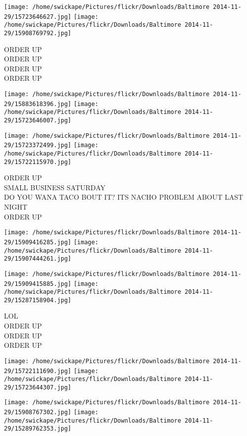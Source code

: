 \documentclass[10pt,letterpaper]{article}
\begin{document}
\texttt{[image: /home/swickape/Pictures/flickr/Downloads/Baltimore 2014-11-29/15723646627.jpg]}
\texttt{[image: /home/swickape/Pictures/flickr/Downloads/Baltimore 2014-11-29/15908769792.jpg]}

ORDER UP\\
ORDER UP\\
ORDER UP\\
ORDER UP\\
\pagebreak

\texttt{[image: /home/swickape/Pictures/flickr/Downloads/Baltimore 2014-11-29/15883618396.jpg]}
\texttt{[image: /home/swickape/Pictures/flickr/Downloads/Baltimore 2014-11-29/15723646007.jpg]}

\texttt{[image: /home/swickape/Pictures/flickr/Downloads/Baltimore 2014-11-29/15723372499.jpg]}
\texttt{[image: /home/swickape/Pictures/flickr/Downloads/Baltimore 2014-11-29/15722115970.jpg]}

ORDER UP\\
SMALL BUSINESS SATURDAY\\
DO YOU WANA TACO BOUT IT?  ITS NACHO PROBLEM ABOUT LAST NIGHT\\
ORDER UP\\
\pagebreak

\texttt{[image: /home/swickape/Pictures/flickr/Downloads/Baltimore 2014-11-29/15909416285.jpg]}
\texttt{[image: /home/swickape/Pictures/flickr/Downloads/Baltimore 2014-11-29/15907444261.jpg]}

\texttt{[image: /home/swickape/Pictures/flickr/Downloads/Baltimore 2014-11-29/15909415885.jpg]}
\texttt{[image: /home/swickape/Pictures/flickr/Downloads/Baltimore 2014-11-29/15287158904.jpg]}

LOL\\
ORDER UP\\
ORDER UP\\
ORDER UP\\
\pagebreak

\texttt{[image: /home/swickape/Pictures/flickr/Downloads/Baltimore 2014-11-29/15722111690.jpg]}
\texttt{[image: /home/swickape/Pictures/flickr/Downloads/Baltimore 2014-11-29/15723644307.jpg]}

\texttt{[image: /home/swickape/Pictures/flickr/Downloads/Baltimore 2014-11-29/15908767302.jpg]}
\texttt{[image: /home/swickape/Pictures/flickr/Downloads/Baltimore 2014-11-29/15289762353.jpg]}
\end{document}

